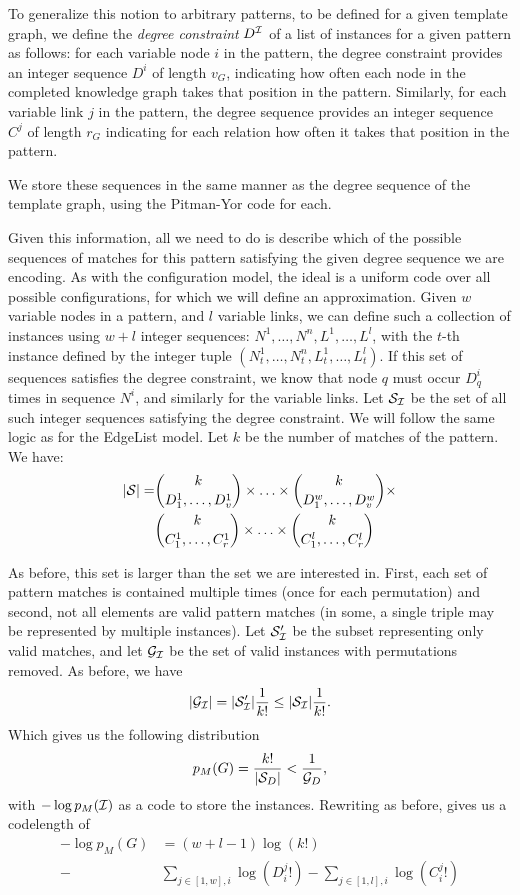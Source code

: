 \documentclass[letterpaper]{article} %
\newcommand{\G}{{\cal G}}
\newcommand{\cS}{{\cal S}}
\newcommand{\I}{{\cal I}}
\begin{document}
 To generalize this notion to arbitrary patterns, to be defined for a given template graph, we define the \emph{degree constraint} $D^\I$ of a list of instances for a given pattern as follows: for each variable node $i$ in the pattern, the degree constraint provides an integer sequence $D^i$ of length $v_G$, indicating how often each node in the completed knowledge graph takes that position in the pattern. Similarly, for each variable link $j$ in the pattern, the degree sequence provides an integer sequence $C^j$ of length $r_G$ indicating for each relation how often it takes that position in the pattern.
 
 We store these sequences in the same manner as the degree sequence of the template graph, using the Pitman-Yor code for each.
 
Given this information, all we need to do is describe which of the possible sequences of matches for this pattern satisfying the given degree sequence we are encoding. As with the configuration model, the ideal is a uniform code over all possible configurations, for which we will define an approximation. Given $w$ variable nodes in a pattern, and $l$ variable links, we can define such a collection of instances using $w+l$ integer sequences: $N^1, \ldots, N^n, L^1, \ldots, L^l$, with the $t$-th instance defined by the integer tuple $(N^1_t, \ldots, N^n_t, L^1_t, \ldots, L^l_t)$. If this set of sequences satisfies the degree constraint, we know that node $q$ must occur $D^i_q$ times in sequence $N^i$, and similarly for the variable links. Let $\cS_\I$ be the set of all such integer sequences satisfying the degree constraint. We will follow the same logic as for the EdgeList model. Let $k$ be the number of matches of the pattern. We have:
\begin{align*}
|\cS| = &{k \choose D^1_1, \ldots, D^1_v}\times \ldots \times{k \choose D^w_1, \ldots, D^w_v}\times \\
&{k \choose C^1_1, \ldots, C^1_r}\times \ldots \times{k \choose C^l_1, \ldots, C^l_r}
\end{align*}

As before, this set is larger than the set we are interested in. First, each set of pattern matches is contained multiple times (once for each permutation) and second, not all elements are valid pattern matches (in some, a single triple may be represented by multiple instances). Let $\cS_\I'$ be the subset representing only valid matches, and let $\G_\I$ be the set of valid instances with permutations removed. As before, we have
\[
|\G_\I| = |\cS'_\I| \frac{1}{k!} \leq  |\cS_\I| \frac{1}{k!} \text{.}
\]
Which gives us the following distribution
\[
p_M(G) =  \frac{k!}{|\cS_D|} < \frac{1}{\G_D} \text{,}
\]
 with $-\log p_M(\I)$ as a code to store the instances. Rewriting as before, gives us a codelength of 
 \begin{align*}
 - \log p_M(G) &= (w+l-1)\log(k!) \\
  -&\sum_{j\in [1,w], i} \log(D^j_i!) -\sum_{j\in [1,l], i} \log(C^j_i!)
 \end{align*}
 
\end{document}
